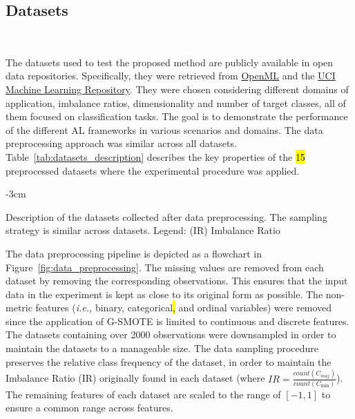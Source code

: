 \documentclass[preprint, 12pt]{elsarticle}
\begin{document}
\subsection{Datasets}~\label{sec:datasets}

The datasets used to test the proposed method are publicly available in open
data repositories. Specifically, they were retrieved from
\href{https://www.openml.org/}{OpenML} and the
\href{https://archive.ics.uci.edu/}{UCI Machine Learning Repository}. They
were chosen considering different domains of application, imbalance ratios,
dimensionality and number of target classes, all of them focused on
classification tasks. The goal is to demonstrate the performance of the
different AL frameworks in various scenarios and domains. The data
preprocessing approach was similar across all datasets.
Table~\ref{tab:datasets_description} describes the key properties of the
\hl{15} preprocessed datasets where the experimental procedure was applied. 
 
\begin{table}[H]
    \centering
    \addtolength{\leftskip} {-3cm}
    \addtolength{\rightskip}{-3cm}
    \caption{\label{tab:datasets_description}
        Description of the datasets collected after data preprocessing. The
        sampling strategy is similar across datasets. Legend: (IR) Imbalance
        Ratio
    }
\end{table}

The data preprocessing pipeline is depicted as a flowchart in
Figure~\ref{fig:data_preprocessing}. The missing values are removed from each
dataset by removing the corresponding observations. This ensures that the
input data in the experiment is kept as close to its original form as
possible. The non-metric features (\textit{i.e.,} binary, categorical\hl{,}
and ordinal variables) were removed since the application of G-SMOTE is
limited to continuous and discrete features. The datasets containing over 2000
observations were downsampled in order to maintain the datasets to a
manageable size. The data sampling procedure preserves the relative class
frequency of the dataset, in order to maintain the Imbalance Ratio (IR)
originally found in each dataset (where $IR =
\frac{count(C_{maj})}{count(C_{\min})}$). The remaining features of each
dataset are scaled to the range of $[-1, 1]$ to ensure a common range across
features.
\end{document}
